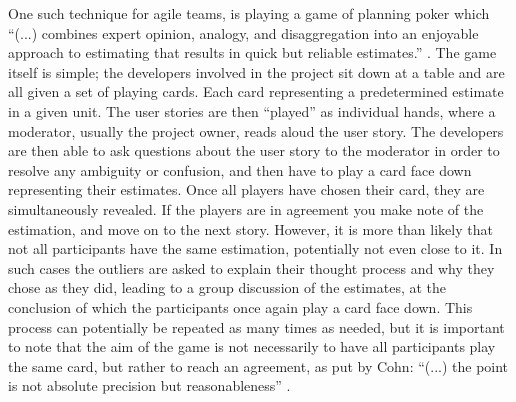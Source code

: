 One such technique for agile teams, is playing a game of planning poker which “(...) combines expert opinion, analogy, and disaggregation into an enjoyable approach to estimating that results in quick but reliable estimates.” \cite[p. 56]{Cohn}. The game itself is simple; the developers involved in the project sit down at a table and are all given a set of playing cards. Each card representing a predetermined estimate in a given unit. The user stories are then “played” as individual hands, where a moderator, usually the project owner, reads aloud the user story. The developers are then able to ask questions about the user story to the moderator in order to resolve any ambiguity or confusion, and then have to play a card face down representing their estimates. Once all players have chosen their card, they are simultaneously revealed. If the players are in agreement you make note of the estimation, and move on to the next story. However, it is more than likely that not all participants have the same estimation, potentially not even close to it. In such cases the outliers are asked to explain their thought process and why they chose as they did, leading to a group discussion of the estimates, at the conclusion of which the participants once again play a card face down. This process can potentially be repeated as many times as needed, but it is important to note that the aim of the game is not necessarily to have all participants play the same card, but rather to reach an agreement, as put by Cohn: “(...) the point is not absolute precision but reasonableness” \cite[p. 57]{Cohn}.
